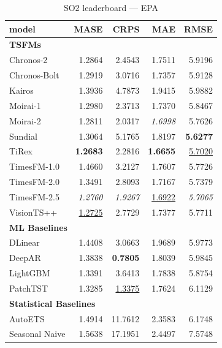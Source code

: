 \begin{table}[H]
\caption{SO2 leaderboard --- EPA}
\centering
\begin{small}
\begin{tabular}{lrrrr}
\toprule
model & MASE & CRPS & MAE & RMSE \\
\midrule
\multicolumn{5}{l}{\textbf{TSFMs}} \\
Chronos-2 & 1.2864 & 2.4543 & 1.7511 & 5.9196 \\
Chronos-Bolt & 1.2919 & 3.0716 & 1.7357 & 5.9128 \\
Kairos & 1.3936 & 4.7873 & 1.9415 & 5.9882 \\
Moirai-1 & 1.2980 & 2.3713 & 1.7370 & 5.8467 \\
Moirai-2 & 1.2811 & 2.0317 & \textit{1.6998} & 5.7626 \\
Sundial & 1.3064 & 5.1765 & 1.8197 & \textbf{5.6277} \\
TiRex & \textbf{1.2683} & 2.2816 & \textbf{1.6655} & \underline{5.7020} \\
TimesFM-1.0 & 1.4660 & 3.2127 & 1.7607 & 5.7726 \\
TimesFM-2.0 & 1.3491 & 2.8093 & 1.7167 & 5.7379 \\
TimesFM-2.5 & \textit{1.2760} & \textit{1.9267} & \underline{1.6922} & \textit{5.7065} \\
VisionTS++ & \underline{1.2725} & 2.7729 & 1.7377 & 5.7711 \\
\midrule
\multicolumn{5}{l}{\textbf{ML Baselines}} \\
DLinear & 1.4408 & 3.0663 & 1.9689 & 5.9773 \\
DeepAR & 1.3838 & \textbf{0.7805} & 1.8039 & 5.9845 \\
LightGBM & 1.3391 & 3.6413 & 1.7838 & 5.8754 \\
PatchTST & 1.3285 & \underline{1.3375} & 1.7624 & 6.1129 \\
\midrule
\multicolumn{5}{l}{\textbf{Statistical Baselines}} \\
AutoETS & 1.4914 & 11.7612 & 2.3583 & 6.1748 \\
Seasonal Naive & 1.5638 & 17.1951 & 2.4497 & 7.5748 \\
\bottomrule
\end{tabular}
\end{small}
\end{table}